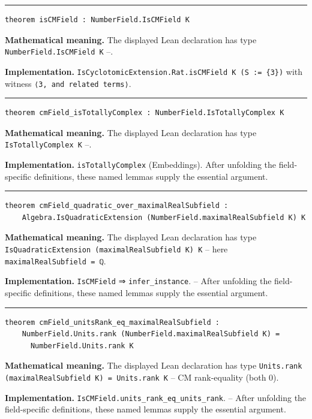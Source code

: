 \documentclass[UTF8,a4paper,11pt,fontset=fandol]{ctexart}
\theoremstyle{definition}
\newcommand{\statementsep}{\par\medskip\hrule\medskip}
\begin{document}
\statementsep
\begin{verbatim}
theorem isCMField : NumberField.IsCMField K
\end{verbatim}
\noindent\textbf{Mathematical meaning.} The displayed Lean declaration has type \texttt{NumberField.\allowbreak{}IsCMField K} --.\par
\noindent\textbf{Implementation.} \texttt{IsCyclotomicExtension.\allowbreak{}Rat.\allowbreak{}isCMField K (S := \{3\})} with witness \texttt{⟨3, and related terms⟩}.\par
\statementsep
\begin{verbatim}
theorem cmField_isTotallyComplex : NumberField.IsTotallyComplex K
\end{verbatim}
\noindent\textbf{Mathematical meaning.} The displayed Lean declaration has type \texttt{IsTotallyComplex K} --.\par
\noindent\textbf{Implementation.} \texttt{isTotallyComplex} (Embeddings). After unfolding the field-specific definitions, these named lemmas supply the essential argument.\par
\statementsep
\begin{verbatim}
theorem cmField_quadratic_over_maximalRealSubfield :
    Algebra.IsQuadraticExtension (NumberField.maximalRealSubfield K) K
\end{verbatim}
\noindent\textbf{Mathematical meaning.} The displayed Lean declaration has type \texttt{IsQuadraticExtension (maximalRealSubfield K) K} -- here \texttt{maximalRealSubfield = ℚ}.\par
\noindent\textbf{Implementation.} \texttt{IsCMField} ⇒ \texttt{infer\_\allowbreak{}instance}. -- After unfolding the field-specific definitions, these named lemmas supply the essential argument.\par
\statementsep
\begin{verbatim}
theorem cmField_unitsRank_eq_maximalRealSubfield :
    NumberField.Units.rank (NumberField.maximalRealSubfield K) =
      NumberField.Units.rank K
\end{verbatim}
\noindent\textbf{Mathematical meaning.} The displayed Lean declaration has type \texttt{Units.\allowbreak{}rank (maximalRealSubfield K) = Units.\allowbreak{}rank K} -- CM rank-equality (both 0).\par
\noindent\textbf{Implementation.} \texttt{IsCMField.\allowbreak{}units\_\allowbreak{}rank\_\allowbreak{}eq\_\allowbreak{}units\_\allowbreak{}rank}. -- After unfolding the field-specific definitions, these named lemmas supply the essential argument.\par
\end{document}
